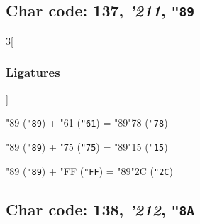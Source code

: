 \documentclass{article}
\newlength{\maxcharwidth}
\begin{document}
\subsection{Char code: 137, {\it'211}, {\tt"89}}
\label{char_137}


\begin{multicols}{3}[\subsubsection{Ligatures}]

{\testfont\char"89\noboundary} ({\tt"89}) + {\testfont\char"61\noboundary} ({\tt"61}) = {\testfont\char"89\noboundary}{\testfont\char"78\noboundary} ({\tt"78}) 

{\testfont\char"89\noboundary} ({\tt"89}) + {\testfont\char"75\noboundary} ({\tt"75}) = {\testfont\char"89\noboundary}{\testfont\char"15\noboundary} ({\tt"15}) 

{\testfont\char"89\noboundary} ({\tt"89}) + {\testfont\char"FF\noboundary} ({\tt"FF}) = {\testfont\char"89\noboundary}{\testfont\char"2C\noboundary} ({\tt"2C}) 

\end{multicols}

\subsection{Char code: 138, {\it'212}, {\tt"8A}}
\label{char_138}

\end{document}

